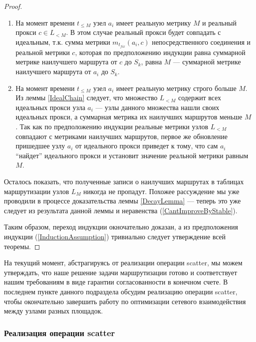 \begin{proof}
    \begin{enumerate}
        \item На момент времени $t_{\leq M}$ узел $a_i$ имеет реальную метрику $M$ и реальный прокси $c \in L_{< M}$. В этом случае реальный прокси будет совпадать с идеальным, т.к. сумма метрики $m_{t_{fix}}(a_i, c)$ непосредственного соединения и реальной метрики $c$, которая по предположению индукции равна суммарной метрике наилучшего маршрута от $c$ до $S_k$, равна $M$ --- суммарной метрике наилучшего маршрута от $a_i$ до $S_k$.
        
        \item На момент времени $t_{\leq M}$ узел $a_i$ имеет реальную метрику строго больше $M$. Из леммы \ref{IdealChain} следует, что множество $L_{< M}$ содержит всех идеальных прокси узла $a_i$ --- узлы данного множества нашли своих идеальных прокси, а суммарная метрика их наилучших маршрутов меньше $M$. Так как по предположению индукции реальные метрики узлов $L_{< M}$ совпадают с метриками наилучших маршрутов, первое же обновление пришедшее узлу $a_i$ от идеального прокси приведет к тому, что сам $a_i$ \enquote{найдет} идеального прокси и установит значение реальной метрики равным $M$.
    \end{enumerate}
    
    Осталось показать, что полученные записи о наилучших маршрутах в таблицах маршрутизации узлов $L_M$ никогда не пропадут. Похожее рассуждение мы уже проводили в процессе доказательства леммы \ref{DecayLemma} --- теперь это уже следует из результата данной леммы и неравенства (\ref{CantImproveByStable}).
    
    Таким образом, переход индукции окночательно доказан, а из предположения индукции (\ref{InductionAssumption}) тривиально следует утверждение всей теоремы.
\end{proof}

На текущий момент, абстрагируясь от реализации операции scatter, мы можем утверждать, что наше решение задачи маршрутизации готово и соответствует нашим требованиям в виде гарантии согласованности в конечном счете. В последнем пункте данного подраздела обсудим реализацию операции scatter, чтобы окончательно завершить работу по оптимизации сетевого взаимодействия между узлами разных площадок.

\subsubsection{Реализация операции scatter}
\label{ScatterImplementation}

